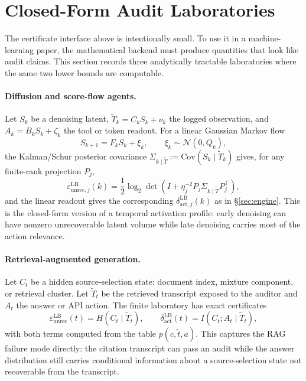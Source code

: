   \section{Closed-Form Audit Laboratories}
  \label{sec:laboratories}

  The certificate interface above is intentionally small. To use it in a
  machine-learning paper, the mathematical backend must produce quantities that
  look like audit claims. This section records three
  analytically tractable laboratories where the same two lower bounds are
  computable.

  \paragraph{Diffusion and score-flow agents.}
  Let $S_k$ be a denoising latent, $\tilde T_k=C_kS_k+\nu_k$ the logged
  observation, and $A_k=B_kS_k+\zeta_k$ the tool or token readout. For a linear
  Gaussian Markov flow
  \[
    S_{k+1}=F_kS_k+\xi_k,
    \qquad
    \xi_k\sim\mathcal N(0,Q_k),
  \]
  the Kalman/Schur posterior covariance
  $\Sigma_{k\mid\tilde T}:=\mathrm{Cov}(S_k\mid\tilde T_k)$ gives, for any
  finite-rank projection $P_j$,
  \[
    \varepsilon_{\mathrm{unrec},j}^{\mathrm{LB}}(k)
    =
    \frac12\log_2\det(I+\eta_j^{-2}P_j\Sigma_{k\mid\tilde T}P_j^\top),
  \]
  and the linear readout gives the corresponding
  $\delta_{\mathrm{act},j}^{\mathrm{LB}}(k)$ as in
  \S\ref{sec:engine}. This is the closed-form version of a temporal activation
  profile: early denoising can have nonzero unrecoverable latent volume while
  late denoising carries most of the action relevance.

  \paragraph{Retrieval-augmented generation.}
  Let $C_t$ be a hidden source-selection state: document index, mixture
  component, or retrieval cluster. Let $\tilde T_t$ be the retrieved transcript
  exposed to the auditor and $A_t$ the answer or API action. The finite
  laboratory has exact certificates
  \[
    \varepsilon_\mathrm{unrec}^\mathrm{LB}(t)
    =
    H(C_t\mid\tilde T_t),
    \qquad
    \delta_\mathrm{act}^\mathrm{LB}(t)
    =
    I(C_t;A_t\mid\tilde T_t),
  \]
  with both terms computed from the table
  $p(c,\tilde t,a)$. This captures the RAG failure mode directly: the citation
  transcript can pass an audit while the answer distribution still carries
  conditional information about a source-selection state not recoverable from
  the transcript.

